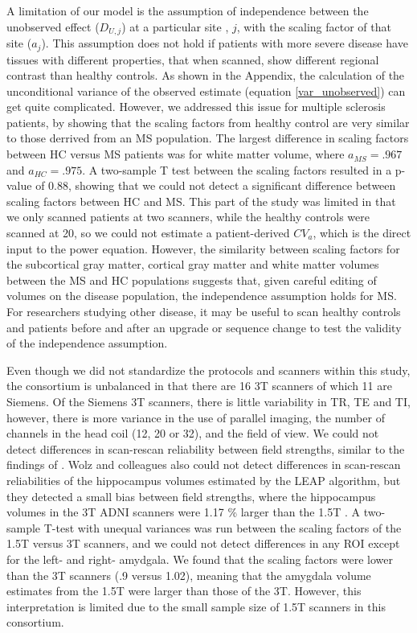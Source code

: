 A limitation of our model is the assumption of independence between the unobserved effect ($D_{U,j}$) at a particular site , $j$, with the scaling factor of that site ($a_j$). This assumption does not hold if patients with more severe disease have tissues with different properties, that when scanned, show different regional contrast than healthy controls. As shown in the Appendix, the calculation of the unconditional variance of the observed estimate (equation \ref{var_unobserved}) can get quite complicated. However, we addressed this issue for multiple sclerosis patients, by showing that the scaling factors from healthy control are very similar to those derrived from an MS population. The largest difference in scaling factors between HC versus MS patients was for white matter volume, where $a_{MS} = .967$ and $a_{HC} = .975$. A two-sample T test between the scaling factors resulted in a p-value of $0.88$, showing that we could not detect a significant difference between scaling factors between HC and MS. This part of the study was limited in that we only scanned patients at two scanners, while the healthy controls were scanned at 20, so we could not estimate a patient-derived $CV_a$, which is the direct input to the power equation. However, the similarity between scaling factors for the subcortical gray matter, cortical gray matter and white matter volumes between the MS and HC populations suggests that, given careful editing of volumes on the disease population, the independence assumption holds for MS. For researchers studying other disease, it may be useful to scan healthy controls and patients before and after an upgrade or sequence change to test the validity of the independence assumption.

Even though we did not standardize the protocols and scanners within this study, the consortium is unbalanced in that there are 16 3T scanners of which 11 are Siemens. Of the Siemens 3T scanners, there is little variability in TR, TE and TI, however, there is more variance in the use of parallel imaging, the number of channels in the head coil (12, 20 or 32), and the field of view. We could not detect differences in scan-rescan reliability between field strengths, similar to the findings of \cite{Jovicich_2009}. Wolz and colleagues also could not detect differences in scan-rescan reliabilities of the hippocampus volumes estimated by the LEAP algorithm, but they detected a small bias between field strengths, where the hippocampus volumes in the 3T ADNI scanners were 1.17 \% larger than the 1.5T \cite{Wolz_2014}. A two-sample T-test with unequal variances was run between the scaling factors of the 1.5T versus 3T scanners, and we could not detect differences in any ROI except for the left- and right- amydgala. We found that the scaling factors were lower than the 3T scanners (.9 versus 1.02), meaning that the amygdala volume estimates from the 1.5T were larger than those of the 3T. However, this interpretation is limited due to the small sample size of 1.5T scanners in this consortium.  